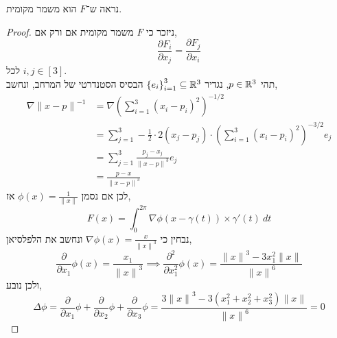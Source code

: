 \subquestion{}
נראה ש־$F$ הוא משמר מקומית.
\begin{proof}
	ניזכר כי $F$ משמר מקומית אם ורק אם,
	\[
		\frac{\partial F_i}{\partial x_j}
		= \frac{\partial F_j}{\partial x_i}
	\]
	לכל $i, j \in [3]$. \\
	תהי $p \in \mathbb{R}^3$, נגדיר ${\{ e_i \}}_{i = 1}^3 \subseteq \mathbb{R}^3$ הבסיס הסטנדרטי של המרחב, ונחשב,
	\begin{align*}
		\nabla {\lVert x - p \rVert}^{-1}
		& = \nabla {\left(\sum_{i = 1}^3 {(x_i - p_i)}^2 \right)}^{-1/2} \\
		& = \sum_{j = 1}^3 - \frac{1}{2} \cdot 2 (x_j - p_j) \cdot {\left(\sum_{i = 1}^3 {(x_i - p_i)}^2 \right)}^{-3/2} e_j \\
		& = \sum_{j = 1}^3 \frac{p_j - x_j}{{\lVert x - p \rVert}^3} e_j \\
		& = \frac{p - x}{{\lVert x - p \rVert}^3}
	\end{align*}
	לכן אם נסמן $\phi(x) = \frac{1}{\lVert x \rVert}$ אז,
	\[
		F(x)
		= \int_{0}^{2 \pi} \nabla \phi(x - \gamma(t)) \times \gamma'(t)\ dt
	\]
	נבחין כי $\nabla \phi(x) = \frac{x}{{\lVert x \rVert}^3}$ ונחשב את הלפלסיאן,
	\[
		\frac{\partial}{\partial x_1} \phi(x)
		= \frac{x_1}{{\lVert x \rVert}^3}
		\implies
		\frac{\partial^2}{\partial x_1^2} \phi(x)
		= \frac{{\lVert x \rVert}^3 - 3 x_1^2 \lVert x \rVert}{{\lVert x \rVert}^6}
	\]
	ולכן נובע,
	\[
		\Delta \phi
		= \frac{\partial}{\partial x_1} \phi + \frac{\partial}{\partial x_2} \phi + \frac{\partial}{\partial x_3} \phi
		= \frac{3 {\lVert x \rVert}^3 - 3 (x_1^2 + x_2^2 + x_3^2) \lVert x \rVert}{{\lVert x \rVert}^6}
		= 0
	\]


\end{proof}
